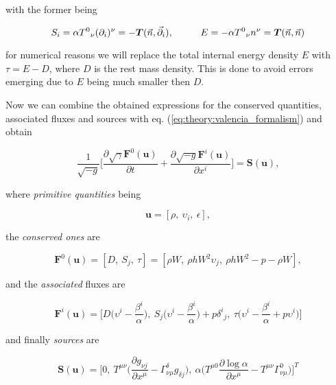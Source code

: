 with the former being 

\begin{equation}
S_{i} = \alpha {T^0}_{\nu}(\partial_i)^{\nu}=-\boldsymbol{T}(\vec{n},\vec{\partial}_i), \hspace{10mm} E = -\alpha{T^0}_{\nu}n^{\nu} = \boldsymbol{T}(\vec{n},\vec{n})
\end{equation}

for numerical reasons we will replace the total internal energy density $E$ with $\tau = E-D$, where $D$ is the rest mass density. 
This is done to avoid errors emerging due to $E$ being much smaller then $D$. 

Now we can combine the obtained expressions for the conserved quantities, associated fluxes and sources with eq. (\ref{eq:theory:valencia_formalism}) and obtain

\begin{equation}
\frac{1}{\sqrt{-g}}\Big[\frac{\partial\sqrt{\gamma}\boldsymbol{F}^{0}(\boldsymbol{u})}{\partial t} + \frac{\partial\sqrt{-g}\boldsymbol{F}^{i}(\boldsymbol{u})}{\partial x^i}\Big] = \boldsymbol{S}(\boldsymbol{u}),
\label{eq:theory:grhdeq_thc} %
\end{equation}

where \textit{primitive quantities} being

\begin{equation}
\boldsymbol{u} = [\rho,\: \upsilon_i,\: \epsilon],
\end{equation}

the \textit{conserved ones} are 

\begin{equation}
\boldsymbol{F}^0(\boldsymbol{u}) = [D,\: S_j,\: \tau] = [\rho W,\: \rho h W^2 \upsilon_j,\: \rho h W^2 - p - \rho W],
\end{equation}

and the \textit{associated} fluxes are 

\begin{equation}
\boldsymbol{F}^i(\boldsymbol{u})=\Bigg[D\Big(\upsilon^{i}-\frac{\beta^i}{\alpha}\Big),\: S_{j}\Big(\upsilon^{i}-\frac{\beta^i}{\alpha}\Big)+p{\delta^i}_j ,\: \tau\Big(\upsilon^{i}-\frac{\beta^i}{\alpha}+p\upsilon^i\Big)\Bigg]
\end{equation}

and finally \textit{sources} are

\begin{equation}
\boldsymbol{S}(\boldsymbol{u}) = \Bigg[0,\: T^{\mu\nu}\Big(\frac{\partial g_{\nu j}}{\partial x^{\mu}} - \Gamma^{\delta}_{\nu\mu}g_{\delta j}\Big),\: \alpha\Big(T^{\mu 0}\frac{\partial\log\alpha}{\partial x^{\mu}}-T^{\mu\nu}\Gamma^{0}_{\nu\mu}\Big)\Bigg]^T
\end{equation}

